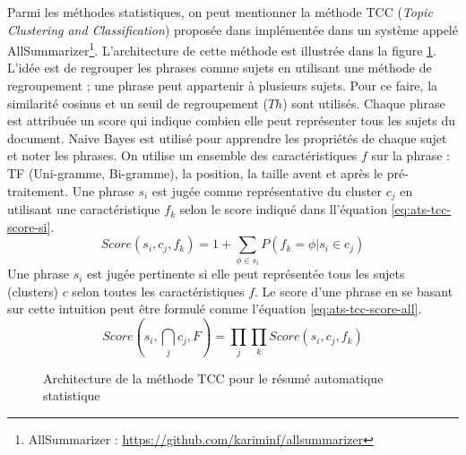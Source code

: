 \documentclass{KodeBook}
\begin{document}
Parmi les méthodes statistiques, on peut mentionner la méthode TCC (\textit{Topic Clustering and Classification}) proposée dans \cite{13-aries-al} implémentée dans un système appelé AllSummarizer\footnote{AllSummarizer : \url{https://github.com/kariminf/allsummarizer}}.
L'architecture de cette méthode est illustrée dans la figure \ref{fig:ats-tcc}.
L'idée est de regrouper les phrases comme sujets en utilisant une méthode de regroupement ; une phrase peut appartenir à plusieurs sujets. 
Pour ce faire, la similarité cosinus et un seuil de regroupement ($Th$) sont utilisés.
Chaque phrase est attribuée un score qui indique combien elle peut représenter tous les sujets du document. 
Naive Bayes est utilisé pour apprendre les propriétés de chaque sujet et noter les phrases.
%
On utilise un ensemble des caractéristiques $f$ sur la phrase : TF (Uni-gramme, Bi-gramme), la position, la taille avent et après le pré-traitement.
Une phrase $s_i$ est jugée comme représentative du cluster $c_j$ en utilisant une caractéristique $f_k$ selon le score indiqué dans ll'équation \ref{eq:ats-tcc-score-si}.
\begin{equation}\label{eq:ats-tcc-score-si}
Score(s_i , c_j , f_k ) = 1 + \sum_{\phi \in s_i} {P(f_k=\phi | s_i \in c_j)}
\end{equation}
Une phrase $s_i$ est jugée pertinente si elle peut représentée tous les sujets (clusters) $c$ selon toutes les caractéristiques $f$.
Le score d'une phrase en se basant sur cette intuition peut être formulé comme l'équation \ref{eq:ats-tcc-score-all}.
\begin{equation}\label{eq:ats-tcc-score-all}
Score(s_i , \bigcap_{j} c_j , F) = \prod_{j} \prod_{k} Score(s_i , c_j , f_k )
\end{equation}

\begin{figure}[!ht]
	\centering
	\caption{Architecture de la méthode TCC pour le résumé automatique statistique \cite{13-aries-al}}
	\label{fig:ats-tcc}
\end{figure}
\end{document}
